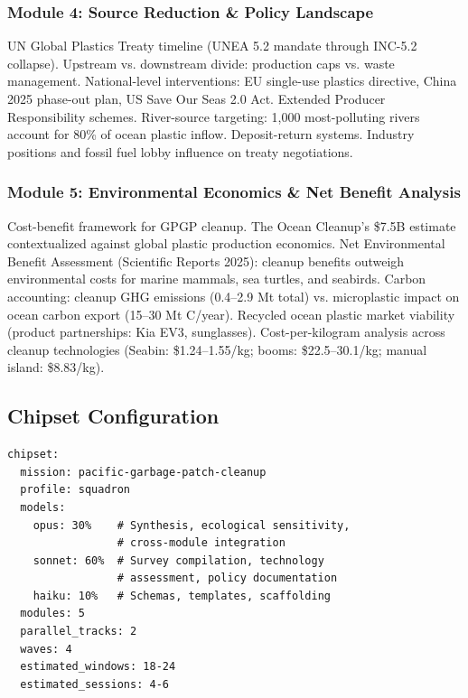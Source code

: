 \documentclass[11pt,letterpaper]{article}
\begin{document}
\subsubsection{Module 4: Source Reduction \& Policy Landscape}
UN Global Plastics Treaty timeline (UNEA 5.2 mandate through INC-5.2 collapse). Upstream vs. downstream divide: production caps vs. waste management. National-level interventions: EU single-use plastics directive, China 2025 phase-out plan, US Save Our Seas 2.0 Act. Extended Producer Responsibility schemes. River-source targeting: 1,000 most-polluting rivers account for 80\% of ocean plastic inflow. Deposit-return systems. Industry positions and fossil fuel lobby influence on treaty negotiations.

\subsubsection{Module 5: Environmental Economics \& Net Benefit Analysis}
Cost-benefit framework for GPGP cleanup. The Ocean Cleanup's \$7.5B estimate contextualized against global plastic production economics. Net Environmental Benefit Assessment (Scientific Reports 2025): cleanup benefits outweigh environmental costs for marine mammals, sea turtles, and seabirds. Carbon accounting: cleanup GHG emissions (0.4--2.9 Mt total) vs. microplastic impact on ocean carbon export (15--30 Mt C/year). Recycled ocean plastic market viability (product partnerships: Kia EV3, sunglasses). Cost-per-kilogram analysis across cleanup technologies (Seabin: \$1.24--1.55/kg; booms: \$22.5--30.1/kg; manual island: \$8.83/kg).

\subsection{Chipset Configuration}

\begin{asciibox}
\begin{verbatim}
chipset:
  mission: pacific-garbage-patch-cleanup
  profile: squadron
  models:
    opus: 30%    # Synthesis, ecological sensitivity,
                 # cross-module integration
    sonnet: 60%  # Survey compilation, technology
                 # assessment, policy documentation
    haiku: 10%   # Schemas, templates, scaffolding
  modules: 5
  parallel_tracks: 2
  waves: 4
  estimated_windows: 18-24
  estimated_sessions: 4-6
\end{verbatim}
\end{asciibox}
\end{document}
